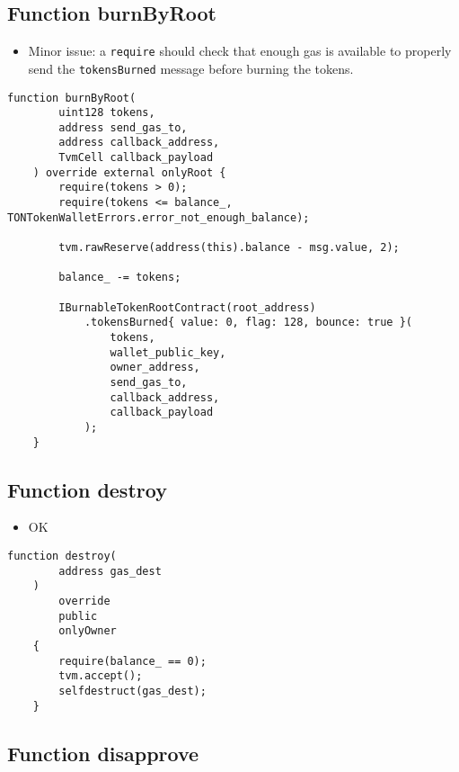 \subsection{Function burnByRoot}

\begin{itemize}
\item Minor issue: a {\tt require} should check that enough gas is
  available to properly send the {\tt tokensBurned} message before
  burning the tokens.
\end{itemize}

\begin{lstlisting}[firstnumber=520]
    function burnByRoot(
        uint128 tokens,
        address send_gas_to,
        address callback_address,
        TvmCell callback_payload
    ) override external onlyRoot {
        require(tokens > 0);
        require(tokens <= balance_, TONTokenWalletErrors.error_not_enough_balance);

        tvm.rawReserve(address(this).balance - msg.value, 2);

        balance_ -= tokens;

        IBurnableTokenRootContract(root_address)
            .tokensBurned{ value: 0, flag: 128, bounce: true }(
                tokens,
                wallet_public_key,
                owner_address,
                send_gas_to,
                callback_address,
                callback_payload
            );
    }
\end{lstlisting}

\subsection{Function destroy}

\begin{itemize}
\item OK
\end{itemize}

\begin{lstlisting}[firstnumber=584]
    function destroy(
        address gas_dest
    )
        override
        public
        onlyOwner
    {
        require(balance_ == 0);
        tvm.accept();
        selfdestruct(gas_dest);
    }
\end{lstlisting}

\subsection{Function disapprove}

